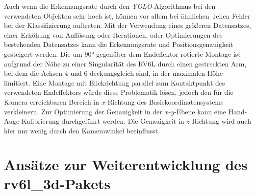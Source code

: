 Auch wenn die Erkennungsrate durch den \textit{\ac{YOLO}}-Algorithmus bei den verwendeten Objekten sehr hoch ist, können vor allem bei ähnlichen Teilen Fehler bei der Klassifizierung auftreten. Mit der Verwendung eines größeren Datensatzes, einer Erhöhung von Auflösung oder Iterationen, oder Optimierungen des bestehenden Datensatzes kann die Erkennungsrate und Positionsgenauigkeit gesteigert werden. Die um $90$° gegenüber dem Endeffektor rotierte Montage ist aufgrund der Nähe zu einer Singularität des RV6L durch einen gestreckten Arm, bei dem die Achsen $4$ und $6$ deckungsgleich sind, in der maximalen Höhe limitiert. Eine Montage mit Blickrichtung parallel zum Kontaktpunkt des verwendeten Endeffektors würde diese Problematik lösen, jedoch den für die Kamera erreichbaren Bereich in $x$-Richtung des Basiskoordinatensystems verkleinern. Zur Optimierung der Genauigkeit in der $x$-$y$-Ebene kann eine Hand-Auge-Kalibrierung durchgeführt werden. Die Genauigkeit in $z$-Richtung wird auch hier nur wenig durch den Kamerawinkel beeinflusst.

\section{Ansätze zur Weiterentwicklung des rv6l\_3d-Pakets}


